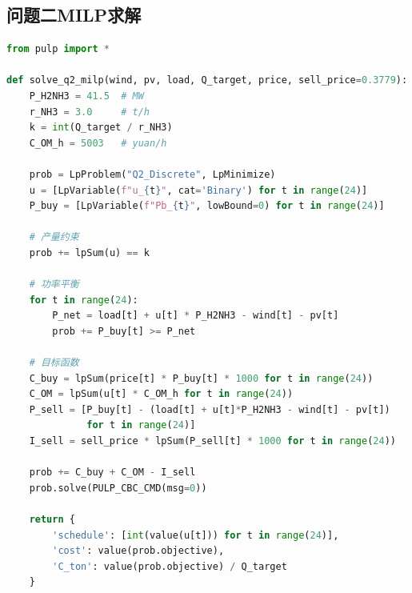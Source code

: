 \subsection{问题二MILP求解}
\begin{lstlisting}[language=Python, basicstyle=\ttfamily\small, breaklines=true]
from pulp import *

def solve_q2_milp(wind, pv, load, Q_target, price, sell_price=0.3779):
    P_H2NH3 = 41.5  # MW
    r_NH3 = 3.0     # t/h
    k = int(Q_target / r_NH3)
    C_OM_h = 5003   # yuan/h
    
    prob = LpProblem("Q2_Discrete", LpMinimize)
    u = [LpVariable(f"u_{t}", cat='Binary') for t in range(24)]
    P_buy = [LpVariable(f"Pb_{t}", lowBound=0) for t in range(24)]
    
    # 产量约束
    prob += lpSum(u) == k
    
    # 功率平衡
    for t in range(24):
        P_net = load[t] + u[t] * P_H2NH3 - wind[t] - pv[t]
        prob += P_buy[t] >= P_net
    
    # 目标函数
    C_buy = lpSum(price[t] * P_buy[t] * 1000 for t in range(24))
    C_OM = lpSum(u[t] * C_OM_h for t in range(24))
    P_sell = [P_buy[t] - (load[t] + u[t]*P_H2NH3 - wind[t] - pv[t])
              for t in range(24)]
    I_sell = sell_price * lpSum(P_sell[t] * 1000 for t in range(24))
    
    prob += C_buy + C_OM - I_sell
    prob.solve(PULP_CBC_CMD(msg=0))
    
    return {
        'schedule': [int(value(u[t])) for t in range(24)],
        'cost': value(prob.objective),
        'C_ton': value(prob.objective) / Q_target
    }
\end{lstlisting}

